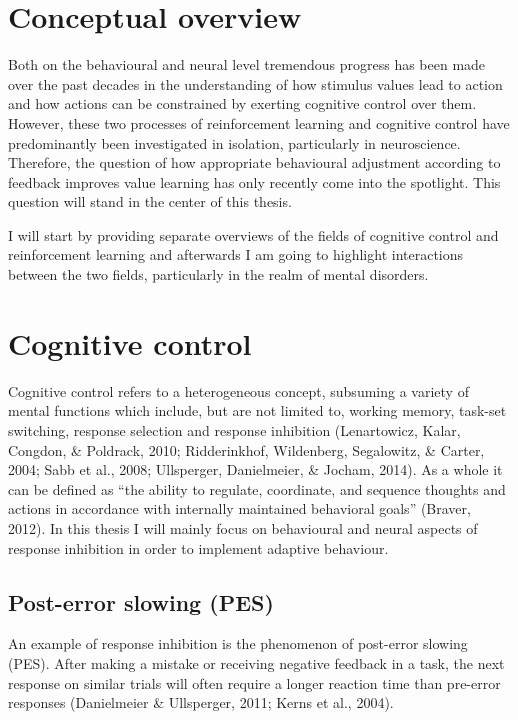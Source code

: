 \documentclass[12pt,openany]{book}
\theoremstyle{definition}
\theoremstyle{definition}
\theoremstyle{definition}
\theoremstyle{remark}
\begin{document}
\section{Conceptual overview}\label{conceptual-overview}

Both on the behavioural and neural level tremendous progress has been
made over the past decades in the understanding of how stimulus values
lead to action and how actions can be constrained by exerting cognitive
control over them. However, these two processes of reinforcement
learning and cognitive control have predominantly been investigated in
isolation, particularly in neuroscience. Therefore, the question of how
appropriate behavioural adjustment according to feedback improves value
learning has only recently come into the spotlight. This question will
stand in the center of this thesis.

I will start by providing separate overviews of the fields of cognitive
control and reinforcement learning and afterwards I am going to
highlight interactions between the two fields, particularly in the realm
of mental disorders.

\section{Cognitive control}\label{cognitive-control}

Cognitive control refers to a heterogeneous concept, subsuming a variety
of mental functions which include, but are not limited to, working
memory, task-set switching, response selection and response inhibition
(Lenartowicz, Kalar, Congdon, \& Poldrack, 2010; Ridderinkhof,
Wildenberg, Segalowitz, \& Carter, 2004; Sabb et al., 2008; Ullsperger,
Danielmeier, \& Jocham, 2014). As a whole it can be defined as ``the
ability to regulate, coordinate, and sequence thoughts and actions in
accordance with internally maintained behavioral goals'' (Braver, 2012).
In this thesis I will mainly focus on behavioural and neural aspects of
response inhibition in order to implement adaptive behaviour.

\subsection{Post-error slowing (PES)}\label{post-error-slowing-pes}

An example of response inhibition is the phenomenon of post-error
slowing (PES). After making a mistake or receiving negative feedback in
a task, the next response on similar trials will often require a longer
reaction time than pre-error responses (Danielmeier \& Ullsperger, 2011;
Kerns et al., 2004).
\end{document}
